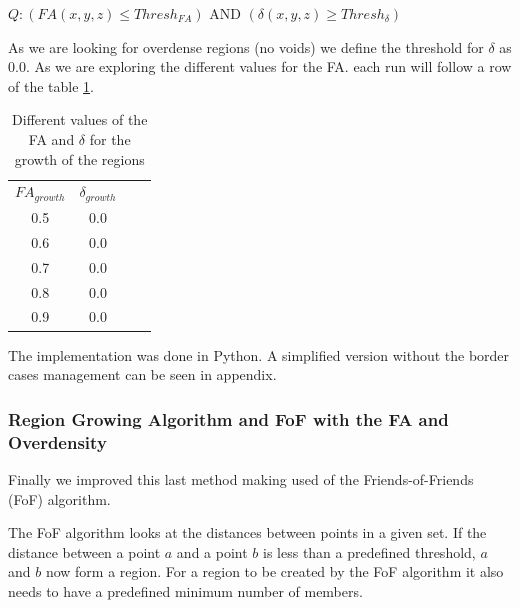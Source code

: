 \documentclass[12pt]{article}
\begin{document}
\begin{itemize}
\begin{par}
\begin{center}
$Q: \left( FA (x,y,z) \leq Thresh_{FA} \right)$ AND
$\left( \delta (x,y,z) \geq Thresh_{\delta} \right)$ 
\end{center}
As we are looking for overdense regions (no voids) we define the
threshold for $\delta$ as 0.0. As we are exploring the different
values for the FA. each run will follow a row of the table \ref{tab:search_FA_Trace}.
\end{par}

\begin{table}[ht]
    \centering
    \begin{tabular}{|c|c|c|c|}
        $FA_{growth}$ & $\delta_{growth}$ \\
        0.5 &  0.0 \\
        0.6 &  0.0 \\
        0.7 &  0.0 \\
        0.8 &  0.0 \\
        0.9 &  0.0 \\
    \end{tabular}
    \caption{Different values of the FA and $\delta$ for the growth of the regions}
    \label{tab:search_FA_Trace}
\end{table}
\FloatBarrier

\end{itemize}

\begin{par}
The implementation was done in Python. A simplified version
without the border cases management can be seen in appendix.
\end{par}

\subsubsection{Region Growing Algorithm and FoF with the FA and Overdensity}\label{sec:fof_impl_descr}
Finally we improved this last method making used of the Friends-of-Friends (FoF) algorithm.
\begin{par}
The FoF algorithm looks at the distances between points in a given
set. If the distance between a point $a$ and a point $b$ is less
than a predefined threshold, $a$ and $b$ now form a region. For a
region to be created by the FoF algorithm it also needs to have a
predefined minimum number of members. 
\end{par}
\end{document}
